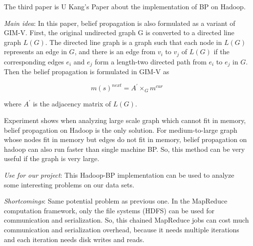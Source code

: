 The third paper is U Kang's Paper about the implementation of BP on Hadoop\cite{UKang2010KDD}.
\begin{itemize*}
\item {\em Main idea}:
In this paper, belief propagation is also formulated as a variant of GIM-V. First, the original undirected graph G is converted to a directed line graph $L(G)$. The directed line graph is a graph such that each node in $L(G)$ represents an edge in $G$, and there is an edge from $v_{i}$ to $v_{j}$ of $L(G)$ if the corresponding edges $e_{i}$ and $e_{j}$ form a length-two directed path from $e_{i}$ to $e_{j}$ in $G$. Then the belief propagation is formulated in GIM-V as

\begin{equation}
	m(s)^{next} = A^{\prime} \times_{G} m^{cur}
\end{equation}

where $A^{\prime}$ is the adjacency matrix of $L(G)$.

Experiment shows when analyzing large scale graph which cannot fit in memory, belief propagation on Hadoop is the only solution. For medium-to-large graph whose nodes fit in memory but edges do not fit in memory, belief propagation on hadoop can also run faster than single machine BP. So, this method can be very useful if the graph is very large. 
\item {\em Use for our project}:
This Hadoop-BP implementation can be used to analyze some interesting problems on our data sets. 
\item {\em Shortcomings}:
Same potential problem as previous one. In the MapReduce computation framework, only the file systems (HDFS) can be used for communication and serialization. So, this chained MapReduce jobs can cost much communication and serialization overhead, because it needs multiple iterations and each iteration needs disk writes and reads.
\end{itemize*}



